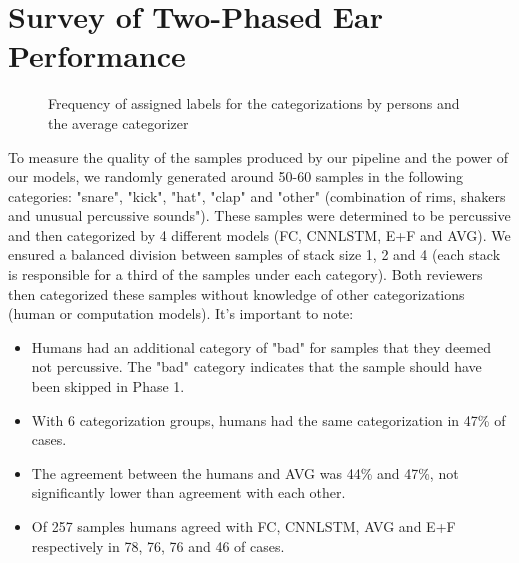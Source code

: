 \documentclass[\main/thesis.tex]{subfiles}
\begin{document}
 \section{Survey of Two-Phased Ear Performance}
\label{survey:2p}
\begin{figure}[H]
    \begin{center}
    \end{center}
    \caption{Frequency of assigned labels for the categorizations by persons and the average categorizer}
\label{fig:freq-survey-2p}
\end{figure}
To measure the quality of the samples produced by our pipeline and the power of our models, we randomly generated around 50-60 samples in the following categories: "snare", "kick", "hat", "clap" and "other" (combination of rims, 
shakers and unusual percussive sounds"). These samples were determined to be percussive and then categorized by 4 different models (FC, CNNLSTM, E+F and AVG). We ensured a balanced division between samples of stack size 1, 2 and 4 (each stack is responsible for a third of the samples under each category). Both reviewers then categorized these samples without knowledge of other categorizations (human or computation models). It's important to note:
\begin{itemize}
    \item Humans had an additional category of "bad" for samples that they deemed not percussive. The "bad" category indicates that the sample should have been skipped in Phase 1. 
    \item With 6 categorization groups, humans had the same categorization in 47\% of cases.
    \item The agreement between the humans and AVG was 44\% and 47\%, not significantly lower than agreement with each other. 
    \item Of 257 samples humans agreed with FC, CNNLSTM, AVG and E+F respectively in 78, 76, 76 and 46 of cases.
\end{itemize}
\end{document}

